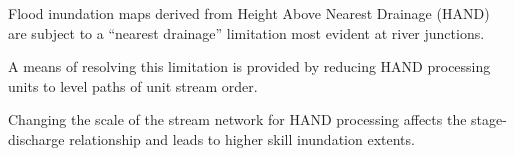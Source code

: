 \documentclass[draft]{dependencies/agujournal2019}
\begin{document}
%
%
 



%
\begin{keypoints}
\item Flood inundation maps derived from Height Above Nearest Drainage (HAND) are subject to a ``nearest drainage'' limitation most evident at river junctions.
\item A means of resolving this limitation is provided by reducing HAND processing units to level paths of unit stream order.
\item Changing the scale of the stream network for HAND processing affects the stage-discharge relationship and leads to higher skill inundation extents.
\end{keypoints}
%
 

%
%

%
%
\end{document}
